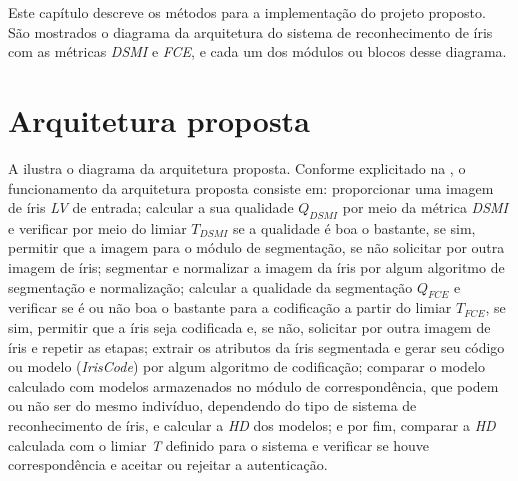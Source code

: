 
\par Este capítulo descreve os métodos para a implementação do projeto proposto. São mostrados o diagrama da arquitetura do sistema de reconhecimento de íris com as métricas \textit{\acrshort{DSMI}} e \textit{\acrshort{FCE}}, e cada um dos módulos ou blocos desse diagrama.


\section{Arquitetura proposta} \label{sec:metodologia:arquitetura}


\par A  ilustra o diagrama da arquitetura proposta. Conforme explicitado na , o funcionamento da arquitetura proposta consiste em: proporcionar uma imagem de íris \textit{\acrfull{LV}} de entrada; calcular a sua qualidade $Q_{DSMI}$ por meio da métrica \textit{\acrshort{DSMI}} e verificar por meio do limiar $T_{DSMI}$ se a qualidade é boa o bastante, se sim, permitir que a imagem para o módulo de segmentação, se não solicitar por outra imagem de íris; segmentar e normalizar a imagem da íris por algum algoritmo de segmentação e normalização; calcular a qualidade da segmentação $Q_{FCE}$ e verificar se é ou não boa o bastante para a codificação a partir do limiar $T_{FCE}$, se sim, permitir que a íris seja codificada e, se não, solicitar por outra imagem de íris e repetir as etapas; extrair os atributos da íris segmentada e gerar seu código ou modelo (\textit{IrisCode}) por algum algoritmo de codificação; comparar o modelo calculado com modelos armazenados no módulo de correspondência, que podem ou não ser do mesmo indivíduo, dependendo do tipo de sistema de reconhecimento de íris, e calcular a \textit{\acrfull{HD}} dos modelos; e por fim, comparar a \textit{\acrshort{HD}} calculada com o limiar \textit{T} definido para o sistema e verificar se houve correspondência e aceitar ou rejeitar a autenticação.

